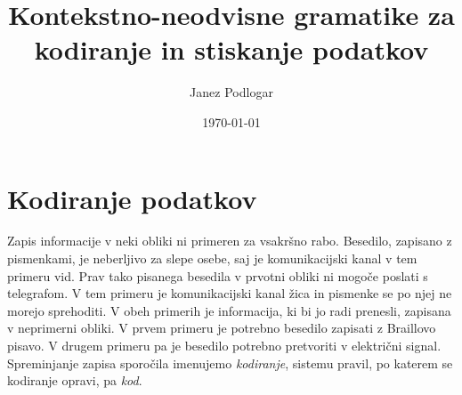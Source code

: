 \documentclass{amsart}
\title{Kontekstno-neodvisne gramatike za kodiranje in stiskanje podatkov}
\author{Janez Podlogar}
\date{\today}
\theoremstyle{definition}
\theoremstyle{plain} %
\begin{document}



\maketitle

\tableofcontents

\section{Kodiranje podatkov}

Zapis informacije v neki obliki ni primeren za vsakršno rabo. Besedilo, zapisano z pismenkami,
je neberljivo za slepe osebe, saj je komunikacijski kanal v tem primeru vid. Prav tako pisanega 
besedila v prvotni obliki ni mogoče poslati s telegrafom. V tem primeru je komunikacijski kanal
žica in pismenke se po njej ne morejo sprehoditi. V obeh primerih je informacija, ki bi jo radi 
prenesli, zapisana v neprimerni obliki. V prvem primeru je potrebno besedilo zapisati z Braillovo
pisavo. V drugem primeru pa je besedilo potrebno pretvoriti v električni signal. Spreminjanje 
zapisa sporočila imenujemo \textit{kodiranje}, sistemu pravil, po katerem se kodiranje opravi, pa
\textit{kod}.
\end{document}
